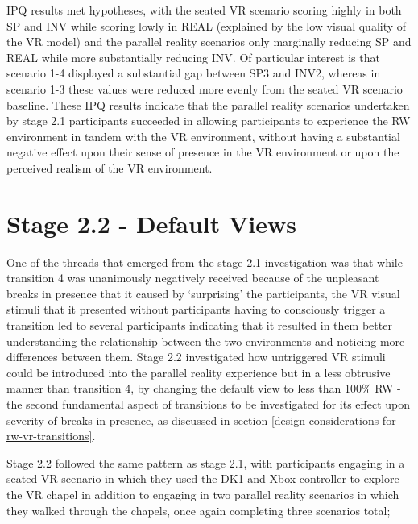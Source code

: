 IPQ results met hypotheses, with the seated VR scenario scoring highly in both SP and INV while scoring lowly in REAL (explained by the low visual quality of the VR model) and the parallel reality scenarios only marginally reducing SP and REAL while more substantially reducing INV. Of particular interest is that scenario 1-4 displayed a substantial gap between SP3 and INV2, whereas in scenario 1-3 these values were reduced more evenly from the seated VR scenario baseline. These IPQ results indicate that the parallel reality scenarios undertaken by stage 2.1 participants succeeded in allowing participants to experience the RW environment in tandem with the VR environment, without having a substantial negative effect upon their sense of presence in the VR environment or upon the perceived realism of the VR environment.




\section{Stage 2.2 - Default Views}

One of the threads that emerged from the stage 2.1 investigation was that while transition 4 was unanimously negatively received because of the unpleasant breaks in presence that it caused by `surprising' the participants, the VR visual stimuli that it presented without participants having to consciously trigger a transition led to several participants indicating that it resulted in them better understanding the relationship between the two environments and noticing more differences between them. Stage 2.2 investigated how untriggered VR stimuli could be introduced into the parallel reality experience but in a less obtrusive manner than transition 4, by changing the default view to less than 100\% RW - the second fundamental aspect of transitions to be investigated for its effect upon severity of breaks in presence, as discussed in section \ref{design-considerations-for-rw-vr-transitions}.

Stage 2.2 followed the same pattern as stage 2.1, with participants engaging in a seated VR scenario in which they used the DK1 and Xbox controller to explore the VR chapel in addition to engaging in two parallel reality scenarios in which they walked through the chapels, once again completing three scenarios total;

